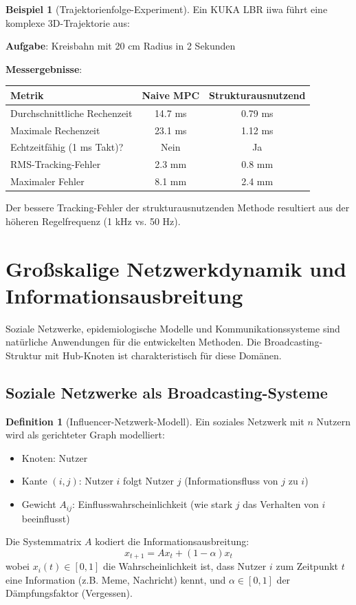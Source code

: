 ﻿\documentclass[a4paper,12pt]{report}
\theoremstyle{definition}
\newtheorem{definition}{Definition}
\newtheorem{beispiel}{Beispiel}
\begin{document}
	\begin{beispiel}[Trajektorienfolge-Experiment]
		Ein KUKA LBR iiwa führt eine komplexe 3D-Trajektorie aus:
		
		\textbf{Aufgabe}: Kreisbahn mit 20 cm Radius in 2 Sekunden
		
		\textbf{Messergebnisse}:
		\begin{center}
			\begin{tabular}{|l|c|c|}
				\hline
				\textbf{Metrik} & \textbf{Naive MPC} & \textbf{Strukturausnutzend} \\
				\hline
				Durchschnittliche Rechenzeit & 14.7 ms & 0.79 ms \\
				Maximale Rechenzeit & 23.1 ms & 1.12 ms \\
				Echtzeitfähig (1 ms Takt)? & Nein & Ja \\
				RMS-Tracking-Fehler & 2.3 mm & 0.8 mm \\
				Maximaler Fehler & 8.1 mm & 2.4 mm \\
				\hline
			\end{tabular}
		\end{center}
		
		Der bessere Tracking-Fehler der strukturausnutzenden Methode resultiert aus der höheren Regelfrequenz (1 kHz vs. 50 Hz).
	\end{beispiel}
	
	\section{Großskalige Netzwerkdynamik und Informationsausbreitung}
	
	Soziale Netzwerke, epidemiologische Modelle und Kommunikationssysteme sind natürliche Anwendungen für die entwickelten Methoden. Die Broadcasting-Struktur mit Hub-Knoten ist charakteristisch für diese Domänen.
	
	\subsection{Soziale Netzwerke als Broadcasting-Systeme}
	
	\begin{definition}[Influencer-Netzwerk-Modell]
		Ein soziales Netzwerk mit $n$ Nutzern wird als gerichteter Graph modelliert:
		\begin{itemize}
			\item Knoten: Nutzer
			\item Kante $(i,j)$: Nutzer $i$ folgt Nutzer $j$ (Informationsfluss von $j$ zu $i$)
			\item Gewicht $A_{ij}$: Einflusswahrscheinlichkeit (wie stark $j$ das Verhalten von $i$ beeinflusst)
		\end{itemize}
		
		Die Systemmatrix $A$ kodiert die Informationsausbreitung:
		\[
		x_{t+1} = A x_t + (1-\alpha) x_t
		\]
		wobei $x_i(t) \in [0,1]$ die Wahrscheinlichkeit ist, dass Nutzer $i$ zum Zeitpunkt $t$ eine Information (z.B. Meme, Nachricht) kennt, und $\alpha \in [0,1]$ der Dämpfungsfaktor (Vergessen).
	\end{definition}
	
\end{document}
